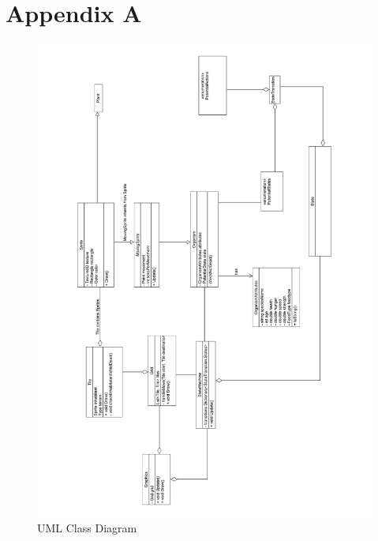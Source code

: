 \documentclass[a4paper, oneside, 11pt]{report}
\begin{document}
\chapter*{Appendix A}

\begin{figure}[H]
	\caption{UML Class Diagram}\label{classdiagram}
	\includegraphics[width=\textwidth]{class-diagram}
\end{figure}
\end{document}
